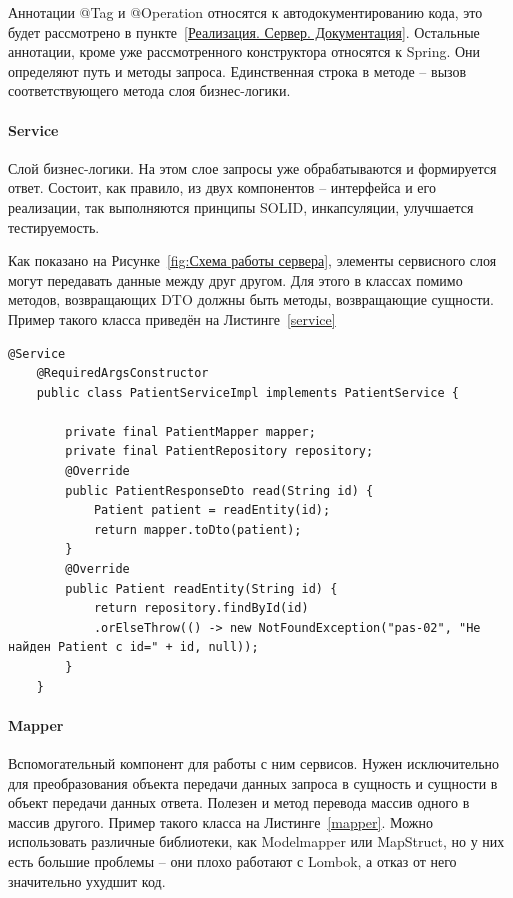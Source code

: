 \documentclass[a4paper,article]{article}
\begin{document}
\begin{sloppypar}
    Аннотации @Tag и @Operation относятся к автодокументированию кода, это будет рассмотрено в пункте~\ref{Реализация. Сервер. Документация}. Остальные аннотации, кроме уже рассмотренного конструктора относятся к Spring. Они определяют путь и методы запроса. Единственная строка в методе -- вызов соответствующего метода слоя бизнес-логики.

    \paragraph{Service}\label{Реализация. Сервер. Service}

    Слой бизнес-логики. На этом слое запросы уже обрабатываются и формируется ответ. Состоит, как правило, из двух компонентов -- интерфейса и его реализации, так выполняются принципы SOLID, инкапсуляции, улучшается тестируемость.

    Как показано на Рисунке~\ref{fig:Схема работы сервера}, элементы сервисного слоя могут передавать данные между друг другом. Для этого в классах помимо методов, возвращающих DTO должны быть методы, возвращающие сущности. Пример такого класса приведён на Листинге~\ref{service}

   \begin{lstlisting}[label=service,caption=Пример класса слоя бизнес-логики]
    @Service
    @RequiredArgsConstructor
    public class PatientServiceImpl implements PatientService {

        private final PatientMapper mapper;
        private final PatientRepository repository;
        @Override
        public PatientResponseDto read(String id) {
            Patient patient = readEntity(id);
            return mapper.toDto(patient);
        }
        @Override
        public Patient readEntity(String id) {
            return repository.findById(id)
            .orElseThrow(() -> new NotFoundException("pas-02", "Не найден Patient с id=" + id, null));
        }
    }
    \end{lstlisting}

    \paragraph{Mapper}\label{Реализация. Сервер. Mapper}

    Вспомогательный компонент для работы с ним сервисов. Нужен исключительно для преобразования объекта передачи данных запроса в сущность и сущности в объект передачи данных ответа. Полезен и метод перевода массив одного в массив другого. Пример такого класса на Листинге~\ref{mapper}. Можно использовать различные библиотеки, как Modelmapper или MapStruct, но у них есть большие проблемы -- они плохо работают с Lombok, а отказ от него значительно ухудшит код.


\end{sloppypar}
\end{document}
